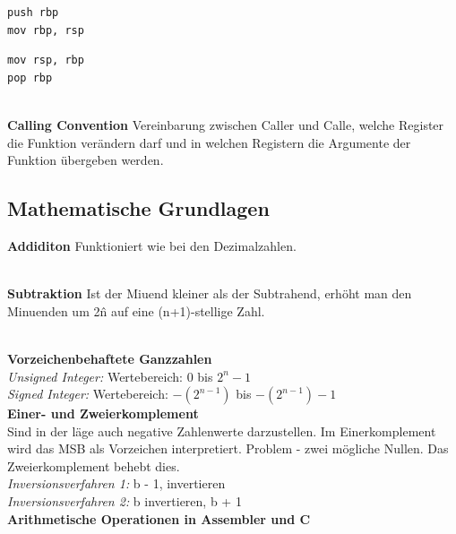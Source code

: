 \documentclass[7pt,landscape,a4paper]{scrartcl}
\begin{document}
\begin{multicols*}{4}
\begin{minipage}[b]{0,5\linewidth}
\begin{verbatim}
push rbp
mov rbp, rsp
\end{verbatim}
\end{minipage}
\begin{minipage}[b]{0,5\linewidth}
\begin{verbatim}
mov rsp, rbp
pop rbp
\end{verbatim}
\end{minipage}\\
\textbf{Calling Convention}
Vereinbarung zwischen Caller und Calle, welche Register die Funktion verändern darf und in welchen Registern die Argumente der Funktion übergeben werden.

\subsection{Mathematische Grundlagen}
\vspace{-0.75em}
\begin{minipage}[b]{0,5\linewidth}
\textbf{Addiditon}
Funktioniert wie bei den Dezimalzahlen.\\\\
\end{minipage}
\begin{minipage}[b]{0,5\linewidth}
\textbf{Subtraktion}
Ist der Miuend kleiner als der Subtrahend, erhöht man den Minuenden um 2\^ n auf eine (n+1)-stellige Zahl.
\end{minipage}\\
\textbf{Vorzeichenbehaftete Ganzzahlen}\\
\textit{Unsigned Integer:} Wertebereich: 0 bis $2^{n}-1$\\
\textit{Signed Integer:} Wertebereich: $-(2^{n-1})$ bis $-(2^{n-1})-1$\\
\textbf{Einer- und Zweierkomplement}\\
Sind in der läge auch negative Zahlenwerte darzustellen. Im Einerkomplement wird das MSB als Vorzeichen interpretiert. Problem - zwei mögliche Nullen. Das Zweierkomplement behebt dies.\\
\textit{Inversionsverfahren 1:} b - 1, invertieren\\
\textit{Inversionsverfahren 2:} b invertieren, b + 1\\
\textbf{Arithmetische Operationen in Assembler und C}\\
\begin{minipage}[b]{0,4\linewidth}

\end{minipage}
\end{multicols*}
\end{document}
